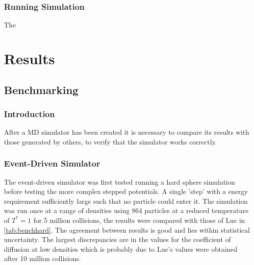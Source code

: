 \documentclass[12pt]{UoAthesis}
\begin{document}
\subsection{Running Simulation}
The

\chapter{Results}
\section{Benchmarking}
\subsection{Introduction}
After a MD simulator has been created it is necessary to compare its
results with those generated by others, to verify that the simulator
works correctly. 
\subsection{Event-Driven Simulator}
The event-driven simulator was first tested running a hard sphere
simulation before testing the more complex stepped potentials.  A
single 'step' with a energy requirement sufficiently large such that
no particle could enter it.  The simulation was run once at a range of
densities using 864 particles at a reduced temperature of $T^*=1$ for
5 million collisions, the results were compared with those of Lue
\cite{Lue2005} in \ref{tab:benchhard}. The agreement between results
is good and lies within statistical uncertainty. The largest
discrepancies are in the values for the coefficient of diffusion at
low densities which is probably due to Lue's values were obtained
after 10 million collisions.
\end{document}

